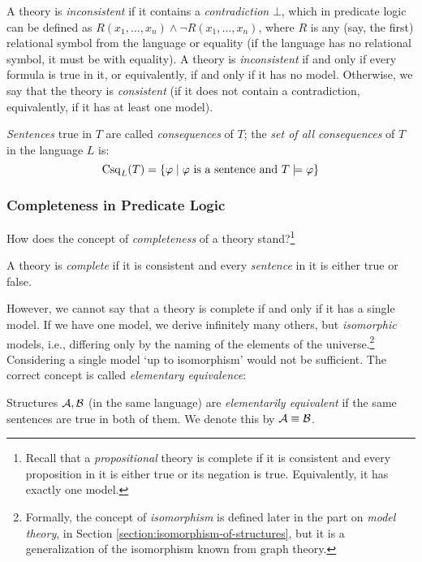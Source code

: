A theory is \emph{inconsistent} if it contains a \emph{contradiction} $\bot$, which in predicate logic can be defined as $R(x_1,\dots,x_n)\land \neg R(x_1,\dots,x_n)$, where $R$ is any (say, the first) relational symbol from the language or equality (if the language has no relational symbol, it must be with equality). A theory is \emph{inconsistent} if and only if every formula is true in it, or equivalently, if and only if it has no model. Otherwise, we say that the theory is \emph{consistent} (if it does not contain a contradiction, equivalently, if it has at least one model).

\emph{Sentences} true in $T$ are called \emph{consequences} of $T$; the \emph{set of all consequences} of $T$ in the language $L$ is:
$$
\operatorname{Csq}_L(T)=\{\varphi\mid\text{$\varphi$ is a sentence and }T\models \varphi\}
$$

\subsubsection{Completeness in Predicate Logic}
How does the concept of \emph{completeness} of a theory stand?\footnote{Recall that a \emph{propositional} theory is complete if it is consistent and every proposition in it is either true or its negation is true. Equivalently, it has exactly one model.}

\begin{definition}
    A theory is \emph{complete} if it is consistent and every \emph{sentence} in it is either true or false.
\end{definition}

However, we cannot say that a theory is complete if and only if it has a single model. If we have one model, we derive infinitely many others, but \emph{isomorphic} models, i.e., differing only by the naming of the elements of the universe.\footnote{Formally, the concept of \emph{isomorphism} is defined later in the part on \emph{model theory}, in Section \ref{section:isomorphism-of-structures}, but it is a generalization of the isomorphism known from graph theory.} Considering a single model `up to isomorphism' would not be sufficient. The correct concept is called \emph{elementary equivalence}:

\begin{definition}
    Structures $\mathcal{A},\mathcal{B}$ (in the same language) are \emph{elementarily equivalent} if the same sentences are true in both of them. We denote this by $\mathcal{A}\equiv\mathcal{B}$.
\end{definition}

